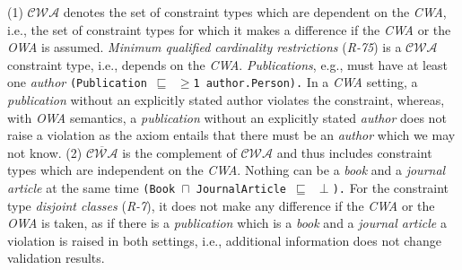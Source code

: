 \documentclass{acm_proc_article-sp}
\newcommand{\ms}[1]{%
  \texttt{#1}
}
\begin{document}
(1) $\mathcal{CWA}$ denotes the set of constraint types which are dependent on the \emph{CWA},
	i.e., the set of constraint types for which it makes a difference if the \emph{CWA} or the \emph{OWA} is assumed.
{\em Minimum qualified cardinality restrictions} (\emph{R-75}) is a $\mathcal{CWA}$ constraint type, i.e., depends on the \emph{CWA}.
\emph{Publications}, e.g., must have at least one \emph{author} {\small\ms{(Publication $\sqsubseteq$ $\geq$1 author.Person).}}
In a \emph{CWA} setting, a \emph{publication} without an explicitly stated author violates the constraint, 
whereas, with \emph{OWA} semantics, 
a \emph{publication} without an explicitly stated \emph{author} does not raise a violation 
as the axiom entails that there must be an \emph{author} which we may not know.
(2) $\overline{\mathcal{CWA}}$ is the complement of $\mathcal{CWA}$ and thus includes constraint types which are independent on the \emph{CWA}.
Nothing can be a \emph{book} and a \emph{journal article}  at the same time {\small\ms{(Book $\sqcap$ JournalArticle $\sqsubseteq$ $\perp$).}}
For the constraint type {\em disjoint classes} (\emph{R-7}), it does not make any difference if the \emph{CWA} or the \emph{OWA} is taken,
as if there is a \emph{publication} which is a \emph{book} and a \emph{journal article} a violation is raised in both settings,
i.e., additional information does not change validation results.

\end{document}
